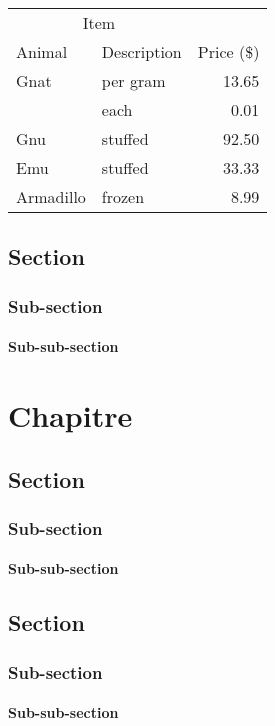 \documentclass[twoside,titlepage,paper=a4,fontsize=12pt,numbers=noenddot,cleardoublepage=empty,BCOR=5mm,openright]{scrreprt}
\begin{document}
\begin{tabular}{@{}llr@{}} \toprule
\multicolumn{2}{c}{Item} \\ \cmidrule(r){1-2}
Animal & Description & Price (\$)\\ \midrule
Gnat & per gram & 13.65 \\
& each & 0.01 \\
Gnu & stuffed & 92.50 \\
Emu & stuffed & 33.33 \\
Armadillo & frozen & 8.99 \\ \bottomrule
\end{tabular}

\section{Section}
\subsection{Sub-section}
\subsubsection{Sub-sub-section}

\chapter{Chapitre}

\section{Section}
\subsection{Sub-section}
\subsubsection{Sub-sub-section}

\section{Section}
\subsection{Sub-section}
\subsubsection{Sub-sub-section}
\end{document}
